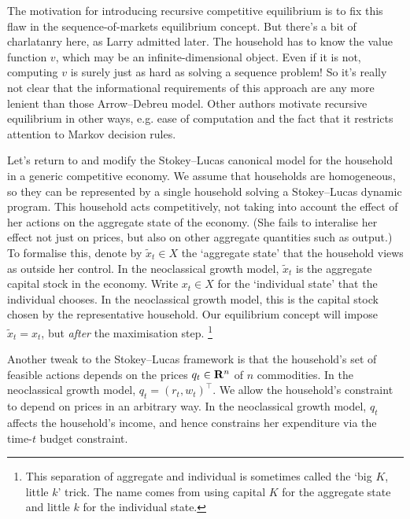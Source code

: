 \documentclass[11pt,letterpaper,reqno,oneside]{article}
\begin{document}
The motivation for introducing recursive competitive equilibrium is to fix this flaw in the sequence-of-markets equilibrium concept. But there's a bit of charlatanry here, as Larry admitted later. The household has to know the value function $v$, which may be an infinite-dimensional object. Even if it is not, computing $v$ is surely just as hard as solving a sequence problem! So it's really not clear that the informational requirements of this approach are any more lenient than those Arrow--Debreu model. Other authors motivate recursive equilibrium in other ways, e.g. ease of computation and the fact that it restricts attention to Markov decision rules.


Let's return to and modify the Stokey--Lucas canonical model for the household in a generic competitive economy. We assume that households are homogeneous, so they can be represented by a single household solving a Stokey--Lucas dynamic program. This household acts competitively, not taking into account the effect of her actions on the aggregate state of the economy. (She fails to interalise her effect not just on prices, but also on other aggregate quantities such as output.) To formalise this, denote by $\widetilde{x}_t \in X$ the `aggregate state' that the household views as outside her control. In the neoclassical growth model, $\widetilde{x}_t$ is the aggregate capital stock in the economy. Write $x_t \in X$ for the `individual state' that the individual chooses. In the neoclassical growth model, this is the capital stock chosen by the representative household. Our equilibrium concept will impose $\widetilde{x}_t = x_t$, but \emph{after} the maximisation step.%
	\footnote{This separation of aggregate and individual is sometimes called the `big $K$, little $k$' trick. The name comes from using capital $K$ for the aggregate state and little $k$ for the individual state.}

Another tweak to the Stokey--Lucas framework is that the household's set of feasible actions depends on the prices $q_t \in \mathbf{R}^n$ of $n$ commodities. In the neoclassical growth model, $q_t = (r_t,w_t)^\top$. We allow the household's constraint to depend on prices in an arbitrary way. In the neoclassical growth model, $q_t$ affects the household's income, and hence constrains her expenditure via the time-$t$ budget constraint.
\end{document}
